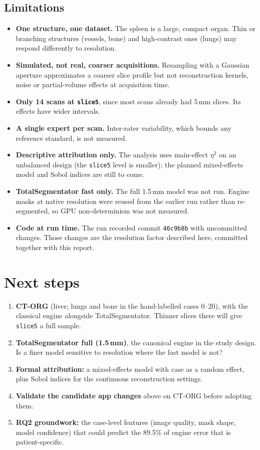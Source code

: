 \documentclass[10pt,a4paper]{article}
\newcommand{\lvl}[1]{\texttt{#1}}
\begin{document}
\subsection{Limitations}
\begin{itemize}
\item \textbf{One structure, one dataset.} The spleen is a large, compact organ. Thin or branching structures (vessels, bone) and high-contrast ones (lungs) may respond differently to resolution.
\item \textbf{Simulated, not real, coarser acquisitions.} Resampling with a Gaussian aperture approximates a coarser slice profile but not reconstruction kernels, noise or partial-volume effects at acquisition time.
\item \textbf{Only 14 scans at \lvl{slice5}}, since most scans already had 5\,mm slices. Its effects have wider intervals.
\item \textbf{A single expert per scan.} Inter-rater variability, which bounds any reference standard, is not measured.
\item \textbf{Descriptive attribution only.} The analysis uses main-effect $\eta^2$ on an unbalanced design (the \lvl{slice5} level is smaller); the planned mixed-effects model and Sobol indices are still to come.
\item \textbf{TotalSegmentator fast only.} The full 1.5\,mm model was not run. Engine masks at native resolution were reused from the earlier run rather than re-segmented, so GPU non-determinism was not measured.
\item \textbf{Code at run time.} The run recorded commit \texttt{46c9b8b} with uncommitted changes. Those changes are the resolution factor described here, committed together with this report.
\end{itemize}

\section{Next steps}
\begin{enumerate}
\item \textbf{CT-ORG} (liver; lungs and bone in the hand-labelled cases 0--20), with the classical engine alongside TotalSegmentator. Thinner slices there will give \lvl{slice5} a full sample.
\item \textbf{TotalSegmentator full (1.5\,mm)}, the canonical engine in the study design. Is a finer model sensitive to resolution where the fast model is not?
\item \textbf{Formal attribution:} a mixed-effects model with case as a random effect, plus Sobol indices for the continuous reconstruction settings.
\item \textbf{Validate the candidate app changes} above on CT-ORG before adopting them.
\item \textbf{RQ2 groundwork:} the case-level features (image quality, mask shape, model confidence) that could predict the 89.5\% of engine error that is patient-specific.
\end{enumerate}
\end{document}
